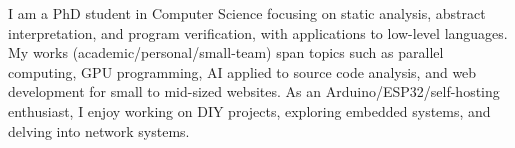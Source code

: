 
\begin{cvparagraph}
    I am a PhD student in Computer Science focusing on static analysis,
    abstract interpretation, and program verification, with applications to
    low-level languages.
    My works (academic/personal/small-team) span topics such as parallel
    computing, GPU programming, AI applied to source code analysis, and web
    development for small to mid-sized websites.
    As an Arduino/ESP32/self-hosting enthusiast, I enjoy working on DIY
    projects, exploring embedded systems, and delving into network systems.
\end{cvparagraph}
